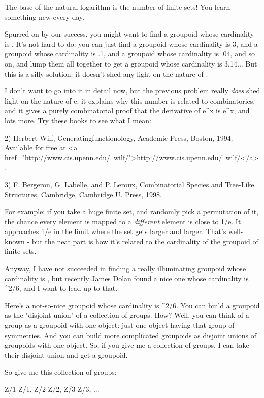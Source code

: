 The base of the natural logarithm is the number of finite sets!
You learn something new every day.

Spurred on by our success, you might want to find a groupoid whose
cardinality is \pi .  It's not hard to do: you can just find a
groupoid whose cardinality is 3, and a groupoid whose cardinality is
.1, and a groupoid whose cardinality is .04, and so on, and lump them
all together to get a groupoid whose cardinality is 3.14...  But this
is a silly solution: it doesn't shed any light on the nature of \pi .

I don't want to go into it in detail now, but the previous problem
really \emph{does} shed light on the nature of e: it explains why this
number is related to combinatorics, and it gives a purely
combinatorial proof that the derivative of e^{x} is
e^{x}, and lots more.  Try these books to see what I mean:

2) Herbert Wilf, Generatingfunctionology, Academic Press, Boston,
1994.  Available for free at <a
href="http://www.cis.upenn.edu/~wilf/">http://www.cis.upenn.edu/~wilf/</a>.

3) F. Bergeron, G. Labelle, and P. Leroux, Combinatorial Species and
Tree-Like Structures, Cambridge, Cambridge U. Press, 1998.

For example: if you take a huge finite set, and randomly pick a
permutation of it, the chance every element is mapped to a
\emph{different} element is close to 1/e.  It approaches 1/e in the
limit where the set gets larger and larger.  That's well-known - but
the neat part is how it's related to the cardinality of the groupoid
of finite sets.

Anyway, I have not succeeded in finding a really illuminating
groupoid whose cardinality is \pi , but recently James Dolan found a
nice one whose cardinality is \pi ^{2}/6, and I want to lead
up to that.

Here's a not-so-nice groupoid whose cardinality is \pi ^{2}/6.
You can build a groupoid as the "disjoint union" of a collection of
groups.  How?  Well, you can think of a group as a groupoid with one
object: just one object having that group of symmetries.  And you can
build more complicated groupoids as disjoint unions of groupoids with
one object.  So, if you give me a collection of groups, I can take
their disjoint union and get a groupoid.

So give me this collection of groups:

Z/1 \times  Z/1, Z/2 \times  Z/2, Z/3 \times  Z/3, ...

